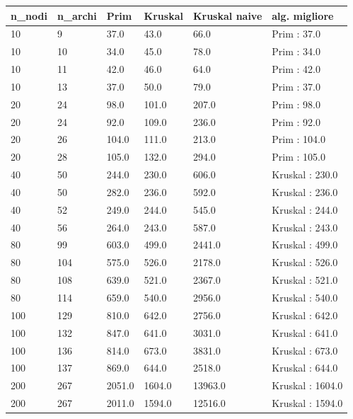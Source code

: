 \renewcommand{\arraystretch}{2}
\begin{longtable}[H]{|p{1.5cm}|p{1.5cm}|p{2cm}|p{2cm}|p{3cm}|p{3cm}|} \hline
    \rowcolor{lightgray}
    \textbf{n\_nodi} & \textbf{n\_archi} & \textbf{Prim} & \textbf{Kruskal} & \textbf{Kruskal naive} & \textbf{alg. migliore}\\ \hline\hline
    \endhead
    10 & 9 & 37.0 & 43.0 & 66.0 & Prim : 37.0 \\ \hline
    10 & 10 & 34.0 & 45.0 & 78.0 & Prim : 34.0 \\ \hline
    10 & 11 & 42.0 & 46.0 & 64.0 & Prim : 42.0 \\ \hline
    10 & 13 & 37.0 & 50.0 & 79.0 & Prim : 37.0 \\ \hline
    20 & 24 & 98.0 & 101.0 & 207.0 & Prim : 98.0 \\ \hline
    20 & 24 & 92.0 & 109.0 & 236.0 & Prim : 92.0 \\ \hline
    20 & 26 & 104.0 & 111.0 & 213.0 & Prim : 104.0 \\ \hline
    20 & 28 & 105.0 & 132.0 & 294.0 & Prim : 105.0 \\ \hline
    40 & 50 & 244.0 & 230.0 & 606.0 & Kruskal : 230.0 \\ \hline
    40 & 50 & 282.0 & 236.0 & 592.0 & Kruskal : 236.0 \\ \hline
    40 & 52 & 249.0 & 244.0 & 545.0 & Kruskal : 244.0 \\ \hline
    40 & 56 & 264.0 & 243.0 & 587.0 & Kruskal : 243.0 \\ \hline
    80 & 99 & 603.0 & 499.0 & 2441.0 & Kruskal : 499.0 \\ \hline
    80 & 104 & 575.0 & 526.0 & 2178.0 & Kruskal : 526.0 \\ \hline
    80 & 108 & 639.0 & 521.0 & 2367.0 & Kruskal : 521.0 \\ \hline
    80 & 114 & 659.0 & 540.0 & 2956.0 & Kruskal : 540.0 \\ \hline
    100 & 129 & 810.0 & 642.0 & 2756.0 & Kruskal : 642.0 \\ \hline
    100 & 132 & 847.0 & 641.0 & 3031.0 & Kruskal : 641.0 \\ \hline
    100 & 136 & 814.0 & 673.0 & 3831.0 & Kruskal : 673.0 \\ \hline
    100 & 137 & 869.0 & 644.0 & 2518.0 & Kruskal : 644.0 \\ \hline
    200 & 267 & 2051.0 & 1604.0 & 13963.0 & Kruskal : 1604.0 \\ \hline 
    200 & 267 & 2011.0 & 1594.0 & 12516.0 & Kruskal : 1594.0 \\ \hline 

\end{longtable}
